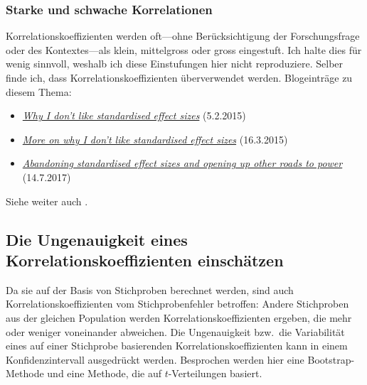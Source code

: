 \documentclass[oneside, 10pt]{book}\usepackage[]{graphicx}\usepackage[]{xcolor}
\begin{document}
\subsubsection{Starke und schwache Korrelationen}
Korrelationskoeffizienten werden oft---ohne
Berücksichtigung der Forschungsfrage oder des
Kontextes---als klein, mittelgross oder gross
eingestuft. Ich halte dies für wenig sinnvoll,
weshalb ich diese Einstufungen hier nicht
reproduziere.
Selber finde ich, dass
Korrelationskoeffizienten überverwendet werden.
Blogeinträge zu diesem Thema:
\begin{itemize}
\item \href{https://janhove.github.io/reporting/2015/02/05/standardised-vs-unstandardised-es}{\textit{Why I don't like standardised effect sizes}} (5.2.2015)
\item \href{https://janhove.github.io/design/2015/03/16/standardised-es-revisited}{\textit{More on why I don't like standardised effect sizes}} (16.3.2015)
\item \href{https://janhove.github.io/design/2017/07/14/OtherRoadsToPower}{\textit{Abandoning standardised effect sizes and opening up other roads to power}} (14.7.2017)
\end{itemize}
Siehe weiter auch \citet{Baguley2009}.

\subsection{Die Ungenauigkeit eines Korrelationskoeffizienten einschätzen}
Da sie auf der Basis von Stichproben berechnet werden,
sind auch Korrelationskoeffizienten vom Stichprobenfehler betroffen:
Andere Stichproben aus der gleichen Population werden Korrelationskoeffizienten
ergeben, die mehr oder weniger voneinander abweichen.
Die Ungenauigkeit bzw.\ die Variabilität eines auf einer Stichprobe
basierenden Korrelationskoeffizienten kann in einem Konfidenzintervall
ausgedrückt werden. Besprochen werden hier eine Bootstrap-Methode
und eine Methode, die auf $t$-Verteilungen basiert.
\end{document}
